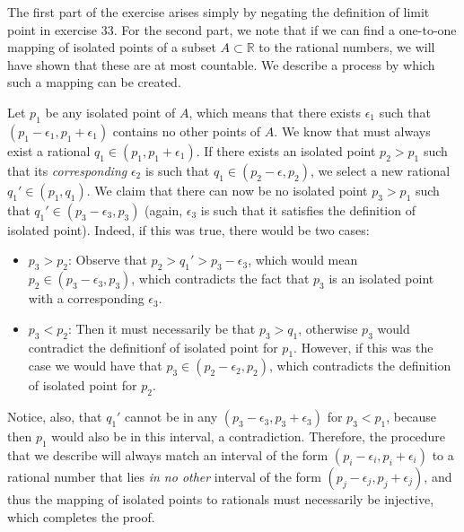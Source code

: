 \begin{solution}

    The first part of the exercise arises simply by negating the definition of limit point in exercise 33.
    For the second part, we note that if we can find a one-to-one mapping of isolated points of a subset $A \subset \mathbb{R}$ to the rational numbers, we will have shown that these are at most countable.
    We describe a process by which such a mapping can be created.

    Let $p_1$ be any isolated point of $A$, which means that there exists $\epsilon_1$ such that $(p_1 - \epsilon_1, p_1 + \epsilon_1)$ contains no other points of $A$.
    We know that must always exist a rational $q_1 \in (p_1, p_1 + \epsilon_1)$.
    If there exists an isolated point $p_2 > p_1$ such that its \textit{corresponding} $\epsilon_2$ is such that $q_1 \in (p_2 - \epsilon, p_2)$, we select a new rational $q_1' \in (p_1, q_1)$.
    We claim that there can now be no isolated point $p_3 > p_1$ such that $q_1' \in (p_3 - \epsilon_3, p_3)$ (again, $\epsilon_3$ is such that it satisfies the definition of isolated point).
    Indeed, if this was true, there would be two cases:
    \begin{itemize}
        \item $p_3 > p_2$: Observe that $p_2 > q_1' > p_3 - \epsilon_3$, which would mean $p_2 \in (p_3 - \epsilon_3, p_3)$, which contradicts the fact that $p_3$ is an isolated point with a corresponding $\epsilon_3$.
        \item $p_3 < p_2$: Then it must necessarily be that $p_3 > q_1$, otherwise $p_3$ would contradict the definitionf of isolated point for $p_1$.
        However, if this was the case we would have that $p_3 \in (p_2 - \epsilon_2, p_2)$, which contradicts the definition of isolated point for $p_2$.
    \end{itemize}
    Notice, also, that $q_1'$ cannot be in any $(p_3 - \epsilon_3, p_3 + \epsilon_3)$ for $p_3 < p_1$, because then $p_1$ would also be in this interval, a contradiction.
    Therefore, the procedure that we describe will always match an interval of the form $(p_i - \epsilon_i, p_i + \epsilon_i)$ to a rational number that lies \textit{in no other} interval of the form $(p_j - \epsilon_j, p_j + \epsilon_j)$, and thus the mapping of isolated points to rationals must necessarily be injective, which completes the proof.


\end{solution}

